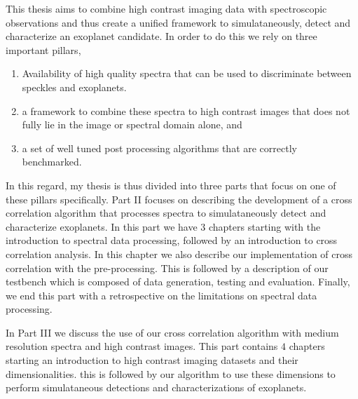 This thesis aims to combine high contrast imaging data with spectroscopic observations and thus create a unified framework to simulataneously,
detect and characterize an exoplanet candidate.
In order to do this we rely on three important pillars,
\begin{enumerate}
    \item Availability of high quality spectra that can be used to discriminate between speckles and exoplanets.
    \item a framework to combine these spectra to high contrast images that does not fully lie in the image or spectral domain alone, and
    \item a set of well tuned post processing algorithms that are correctly benchmarked.
\end{enumerate}
In this regard, my thesis is thus divided into three parts that focus on one of these pillars specifically.
Part II focuses on describing the development of a cross correlation algorithm that processes spectra to simulataneously\@
detect and characterize exoplanets.
In this part we have $3$ chapters starting with the introduction to spectral data processing, followed by an introduction
to cross correlation analysis. 
In this chapter we also describe our implementation of cross correlation with the pre-processing.
This is followed by a description of our testbench which is composed of data generation, testing and evaluation.
Finally, we end this part with a retrospective on the limitations on spectral data processing. 

In Part III we discuss the use of our cross correlation algorithm with medium resolution spectra and high contrast images.
This part contains $4$ chapters starting an introduction to high contrast imaging datasets and their dimensionalities.
this is followed by our algorithm to use these dimensions to perform simulataneous detections and characterizations of exoplanets.

